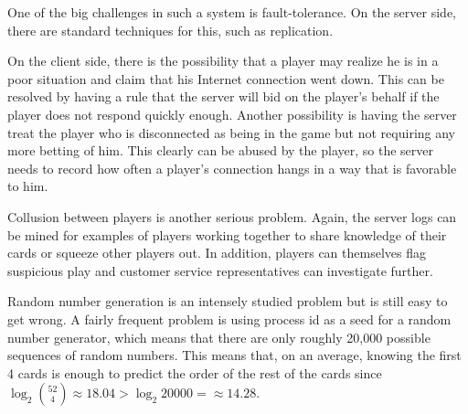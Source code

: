 One of the big challenges in such a system is fault-tolerance.
On the server side, there are standard techniques for this, such
as replication. 

On the client side, there is the possibility that
a player may realize he is in a poor situation and claim that his Internet
connection went down. This can be resolved by having a rule that 
the server will bid on the player's behalf if the player does not respond
quickly enough. Another possibility is having the server treat the
player who is disconnected as being in the game but not requiring any
more betting of him.  This clearly can be abused by the player, so 
the server needs to record how often a player's connection hangs
in a way that is favorable to him.

Collusion between players is another serious problem.  Again, the server logs
can be mined for examples of players working together to share knowledge
of their cards or squeeze other players out. In addition, players
can themselves flag suspicious play and customer service representatives can investigate further.

Random number generation is an intensely studied problem but is
still easy to get wrong. A fairly frequent problem is using process id
as a seed for a random number generator, which means that
there are only roughly 20,000 possible sequences of random numbers.
This means that, on an average, knowing the first 4 cards is enough
to predict the order of the rest of the cards 
since $ \log_2 \binom{52}{4} \approx 18.04 > \log_2 20000 = \approx 14.28$.


